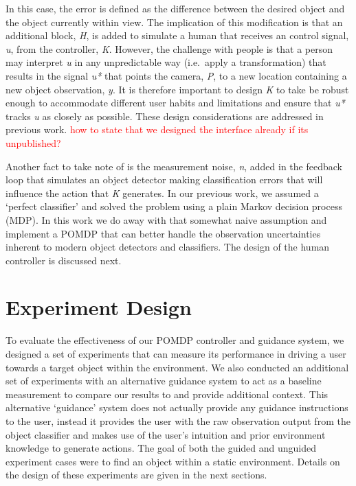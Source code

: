 \documentclass[runningheads]{llncs}
\newcommand\todo[1]{\textcolor{red}{#1}}
\begin{document}
In this case, the error is defined as the difference between the desired object and the object currently within view. 
The implication of this modification is that an additional block, \emph{H}, is added to simulate a human that receives an control signal, \emph{u}, from the controller, \emph{K}. 
However, the challenge with people is that a person may interpret \emph{u} in any unpredictable way (i.e.\ apply a transformation) that results in the signal \emph{u*} that points the camera, \emph{P}, to a new location containing a new object observation, \emph{y}.
It is therefore important to design \emph{K} to take be robust enough to accommodate different user habits and limitations and ensure that \emph{u*} tracks \emph{u} as closely as possible. 
These design considerations are addressed in previous work. \todo{how to state that we designed the interface already if its unpublished?}

Another fact to take note of is the measurement noise, \emph{n}, added in the feedback loop that simulates an object detector making classification errors that will influence the action that \emph{K} generates. 
In our previous work, we assumed a `perfect classifier' and solved the problem using a plain Markov decision process (MDP). 
In this work we do away with that somewhat naive assumption and implement a POMDP that can better handle the observation uncertainties inherent to modern object detectors and classifiers. 
The design of the human controller is discussed next. 

\section{Experiment Design}

To evaluate the effectiveness of our POMDP controller and guidance system, we designed a set of experiments that can measure its performance in driving a user towards a target object within the environment. 
We also conducted an additional set of experiments with an alternative guidance system to act as a baseline measurement to compare our results to and provide additional context. 
This alternative `guidance' system does not actually provide any guidance instructions to the user, instead it provides the user with the raw observation output from the object classifier and makes use of the user's intuition and prior environment knowledge to generate actions. 
The goal of both the guided and unguided experiment cases were to find an object within a static environment. 
Details on the design of these experiments are given in the next sections. 
\end{document}
